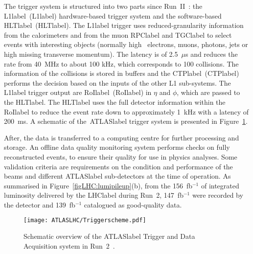 The trigger system is structured into two parts since Run~II~\cite{Jenni:616089,Ruiz-Martinez:2133909}: the \acrlong{L1label}~(\acrshort{L1label}) hardware-based trigger system and the software-based \acrlong{HLTlabel}~(\acrshort{HLTlabel}). The \acrshort{L1label} trigger uses reduced-granularity information from the calorimeters and from the muon \acrshort{RPClabel} and \acrshort{TGClabel} to select events with interesting objects (normally high \pT\ electrons, muons, photons, jets or high missing transverse momentum). The latency is of 2.5~$\mu$s and reduces the rate from 40~MHz to about 100 kHz, which corresponds to 100 collisions. The information of the collisions is stored in buffers and the \acrlong{CTPlabel}~(\acrshort{CTPlabel}) performs the decision based on the inputs of the other L1 sub-systems. The \acrshort{L1label} trigger output are \acrlong{RoIlabel}~(\acrshort{RoIlabel}) in $\eta$ and $\phi$, which are passed to the \acrshort{HLTlabel}. The \acrshort{HLTlabel} uses the full detector information within the \acrshort{RoIlabel} to reduce the event rate down to approximately 1~kHz with a latency of 200~ms. A schematic of the~\acrshort{ATLASlabel} trigger system is presented in Figure~\ref{figLHC:ATLASTDAQ}.

After, the data is transferred to a computing centre for further processing and storage. An offline data quality monitoring system performs checks on fully reconstructed events, to ensure their quality for use in physics analyses. Some validation criteria are requirements on the condition and performance of the beams and different \acrshort{ATLASlabel} sub-detectors at the time of operation. As summarised in Figure~\ref{figLHC:lumipileup}(b), from the 156~fb$^{-1}$ of integrated luminosity delivered by the \acrshort{LHClabel} during Run~2, 147~fb$^{-1}$ were recorded by the detector and 139~fb$^{-1}$ catalogued as good-quality data.

\begin{figure}[htbp]
    \RawFloats
    \begin{center}
    \texttt{[image: ATLASLHC/Triggerscheme.pdf]}
    \caption{
        Schematic overview of the \acrshort{ATLASlabel} Trigger and Data Acquisition system in Run~2~\cite{publicTDAQ}. 
    }
    \label{figLHC:ATLASTDAQ}
    \end{center}
\end{figure}